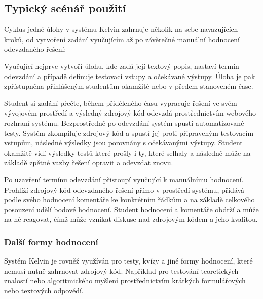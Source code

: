 \subsection{Typický scénář použití}
\label{subsec:kelvin-workflow}

Cyklus jedné úlohy v systému Kelvin zahrnuje několik na sebe navazujících kroků, od vytvoření zadání vyučujícím až po závěrečné manuální hodnocení odevzdaného řešení:

Vyučující nejprve vytvoří úlohu, kde zadá její textový popis, nastaví termín odevzdání a případě definuje testovací vstupy a očekávané výstupy.
Úloha je pak zpřístupněna přihlášeným studentům okamžitě nebo v předem stanoveném čase.

Student si zadání přečte, během přiděleného času vypracuje řešení ve svém vývojovém prostředí a výsledný zdrojový kód odevzdá prostřednictvím webového rozhraní systému.
Bezprostředně po odevzdání systém spustí automatizované testy.
Systém zkompiluje zdrojový kód a spustí jej proti připraveným testovacím vstupům, následné výsledky jsou porovnány s očekávanými výstupy.
Student okamžitě vidí výsledky testů které prošly i ty, které selhaly a následně může na základě zpětné vazby řešení opravit a odevzdat znovu.

Po uzavření termínu odevzdání přistoupí vyučující k manuálnímu hodnocení.
Prohlíží zdrojový kód odevzdaného řešení přímo v prostředí systému, přidává podle svého hodnocení komentáře ke konkrétním řádkům a na základě celkového posouzení udělí bodové hodnocení.
Student hodnocení a komentáře obdrží a může na ně reagovat, čímž může vznikat diskuse nad zdrojovým kódem a jeho kvalitou.

\subsubsection*{Další formy hodnocení}
\label{subsubsec:kelvin-other-assessments}

Systém Kelvin je rovněž využíván pro testy, kvízy a jiné formy hodnocení, které nemusí nutně zahrnovat zdrojový kód.
Například pro testování teoretických znalostí nebo algoritmického myšlení prostřednictvím krátkých formulářových nebo textových odpovědí.

\endinput
